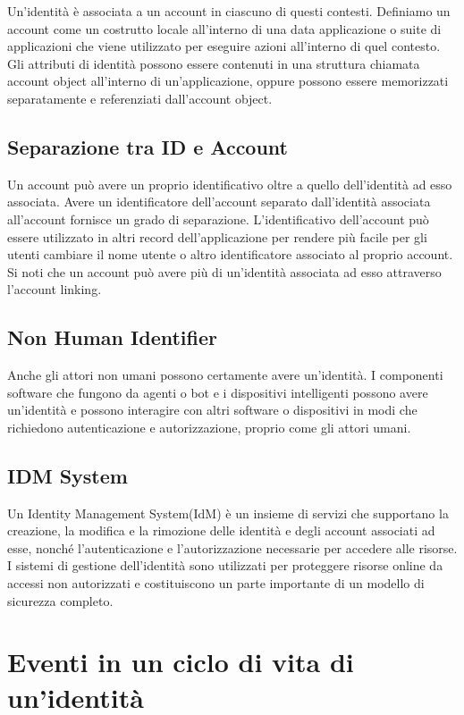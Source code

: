 Un'identità è associata a un account in ciascuno di questi contesti.
Definiamo un account come un costrutto locale all'interno di una data
applicazione o suite di applicazioni che viene utilizzato per eseguire azioni
all'interno di quel contesto.
Gli attributi di identità possono essere contenuti in una struttura chiamata
account object all'interno di un'applicazione,
oppure possono essere memorizzati separatamente e referenziati dall'account object.

\subsection{Separazione tra ID e Account}

Un account può avere un proprio identificativo oltre a quello dell'identità ad
esso associata. Avere un identificatore dell'account separato dall'identità
associata all'account fornisce un grado di separazione.
L'identificativo dell'account può essere utilizzato in altri record dell'applicazione
per rendere più facile per gli utenti cambiare il nome utente o altro identificatore
associato al proprio account.
Si noti che un account può avere più di un'identità associata ad esso attraverso
l'account linking.

\subsection{Non Human Identifier}

Anche gli attori non umani possono certamente avere un'identità.
I componenti software che fungono da agenti o bot e i dispositivi intelligenti
possono avere un'identità e possono interagire con altri software o dispositivi
in modi che richiedono autenticazione e autorizzazione, proprio come gli attori
umani.

\subsection{IDM System}

Un Identity Management System(IdM) è un insieme di servizi che supportano
la creazione, la modifica e la rimozione delle identità e degli account associati
ad esse,
nonché l'autenticazione e l'autorizzazione necessarie per accedere alle risorse.
I sistemi di gestione dell'identità sono utilizzati per proteggere risorse online
da accessi non autorizzati e costituiscono un parte importante di un modello di
sicurezza completo.

\section{Eventi in un ciclo di vita di un'identità}

